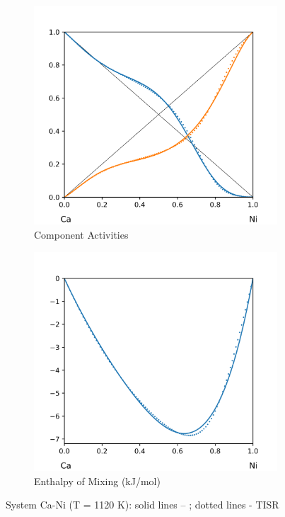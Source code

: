 \documentclass[12pt,abstract]{scrartcl}
\begin{document}
\begin{figure}
\centering
\begin{subfigure}{.5\textwidth}
  \centering
  \includegraphics[width=1\linewidth]{Ca-Ni_Activity}
  \caption{Component Activities}
  \label{fig:sub1}
\end{subfigure}%
\begin{subfigure}{.5\textwidth}
  \centering
  \includegraphics[width=1\linewidth]{Ca-Ni_Enthalpy}
  \caption{Enthalpy of Mixing (kJ/mol)}
  \label{fig:sub2}
\end{subfigure}
\caption{System Ca-Ni (T = 1120 K): solid lines -- \cite{Ca-Ni_Data}; dotted lines - TISR}
\label{fig:Ca-Ni}
\end{figure}
\end{document}
